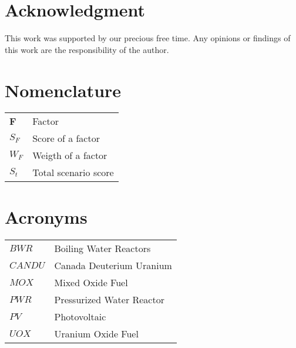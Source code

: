 \documentclass[IJPHM, 2017, 29]{PHMSociety}
\begin{document}
\section*{Acknowledgment}
This work was supported by our precious free time. Any opinions or findings of this work are the responsibility of the author.




\section*{Nomenclature}

\begin{tabular}{ l  l }
    \textbf{F}           &Factor\\
    \textbf{$S_F$}           &Score of a factor\\
    \textbf{$W_F$}           &Weigth of a factor\\
    \textbf{$S_t$}           &Total scenario score\\
 \end{tabular}


\section*{Acronyms}

\begin{tabular}{ l  l }
    $BWR$         &Boiling Water Reactors\\
    $CANDU$       &Canada Deuterium Uranium\\
    $MOX$         &Mixed Oxide Fuel\\
    $PWR$         &Pressurized Water Reactor\\
    $PV$          &Photovoltaic\\
    $UOX$         &Uranium Oxide Fuel
 \end{tabular}


\clearpage

\end{document}
